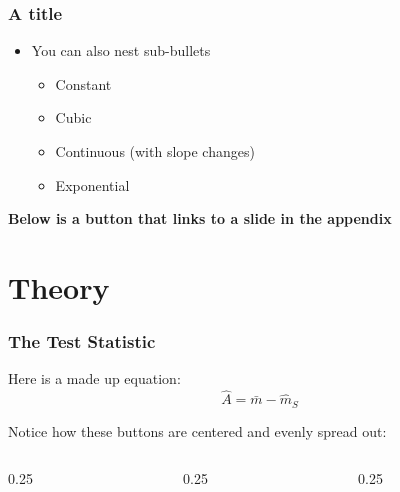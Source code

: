 \documentclass[
    11pt, %
    aspectratio=169, %
]{beamer}
\begin{document}
\begin{frame}
\label{Test} %
	\frametitle{A title}

        \begin{itemize}
            \item You can also nest sub-bullets
            \begin{itemize}
                \item Constant
                \item Cubic
                \item Continuous (with slope changes)
                \item Exponential \newline
            \end{itemize}
        \end{itemize}

        \textbf{Below is a button that links to a slide in the appendix}
        
        \begin{center}
            \hyperlink{Figure}{}    
        \end{center}
\end{frame}

\section{Theory}

\begin{frame}
\label{Test Stat}
	\frametitle{The Test Statistic}
		
        Here is a made up equation:
        $$ \hat{A} = \bar{m}-\hat{m}_S$$ \newline

        Notice how these buttons are centered and evenly spread out:\newline

        \begin{columns}[t] %
		\begin{column}{0.25\textwidth} %
                \hyperlink{Terms}{}
		\end{column}
  		\begin{column}{0.25\textwidth} %
                \hyperlink{Definitions}{}
		\end{column}
            \begin{column}{0.25\textwidth} %
                \hyperlink{Theorems}{}
		\end{column}
	\end{columns}
        
\end{frame}
\end{document}
